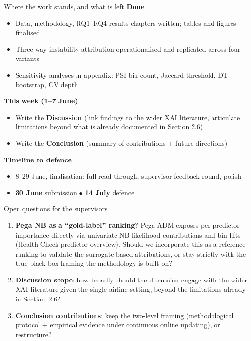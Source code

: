 \documentclass[aspectratio=169,11pt]{beamer}
\begin{document}
\begin{frame}{Where the work stands, and what is left}
  \footnotesize
  \textbf{Done}
  \begin{itemize}
    \setlength\itemsep{0em}
    \item Data, methodology, RQ1--RQ4 results chapters written; tables and figures finalised
    \item Three-way instability attribution operationalised and replicated across four variants
    \item Sensitivity analyses in appendix: PSI bin count, Jaccard threshold, DT bootstrap, CV depth
  \end{itemize}
  \vspace{0.3em}
  \textbf{This week (1--7 June)}
  \begin{itemize}
    \setlength\itemsep{0em}
    \item Write the \textbf{Discussion} (link findings to the wider XAI literature, articulate limitations beyond what is already documented in Section 2.6)
    \item Write the \textbf{Conclusion} (summary of contributions + future directions)
  \end{itemize}
  \vspace{0.3em}
  \textbf{Timeline to defence}
  \begin{itemize}
    \setlength\itemsep{0em}
    \item 8--29 June, finalisation: full read-through, supervisor feedback round, polish
    \item \textbf{30 June} submission \quad $\bullet$ \quad \textbf{14 July} defence
  \end{itemize}
\end{frame}

\begin{frame}{Open questions for the supervisors}
  \begin{enumerate}
    \setlength\itemsep{0.8em}
    \item \textbf{Pega NB as a ``gold-label'' ranking?} Pega ADM exposes per-predictor importance directly via univariate NB likelihood contributions and bin lifts (Health Check predictor overview). Should we incorporate this as a reference ranking to validate the surrogate-based attributions, or stay strictly with the true black-box framing the methodology is built on?
    \item \textbf{Discussion scope}: how broadly should the discussion engage with the wider XAI literature given the single-airline setting, beyond the limitations already in Section~2.6?
    \item \textbf{Conclusion contributions}: keep the two-level framing (methodological protocol + empirical evidence under continuous online updating), or restructure?
  \end{enumerate}
\end{frame}
\end{document}
